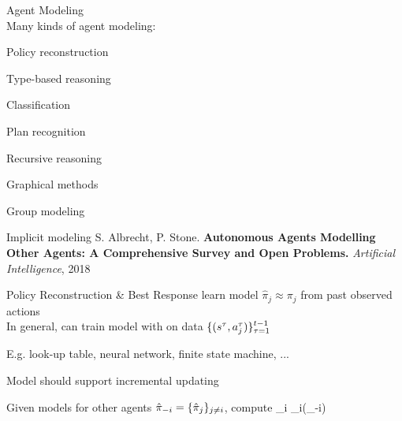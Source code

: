 \begin{frame}[t]{Agent Modeling}
    \center
     \\[1.5em]
    Many kinds of agent modeling: \\[0.7em]
    \bcol
            \blist
                \itemsep=1pt
                \item Policy reconstruction
                \item Type-based reasoning
                \item Classification
                \item Plan recognition
            \elist
            \blist
                \itemsep=1pt
                \item Recursive reasoning
                \item Graphical methods
                \item Group modeling
                \item Implicit modeling
            \elist
    \ecol
    \vspace{8pt}
    \scriptsize{S. Albrecht, P. Stone. \bf Autonomous Agents Modelling Other Agents: A Comprehensive Survey and Open Problems.} {\it Artificial Intelligence}, 2018
\end{frame}

\begin{frame}{Policy Reconstruction \& Best Response}
     learn model $\hat{\pi}_j \approx \pi_j$ from past observed actions \\[1em]

    In general, can train model with  on data $\{(s^\tau,a_j^\tau)\}_{\tau=1}^{t-1}$
    \blist
        \item E.g. look-up table, neural network, finite state machine, ...
        \item Model should support incremental updating
    \elist

    \vspace{5pt}
    \pause
    
    Given models for other agents $\hat{\pi}_{-i} = \{ \hat{\pi}_j \}_{j \neq i}$, compute 
    \bmath
	\pol_i \in \br_i(\agmod_{-i})
    \emath
\end{frame}

